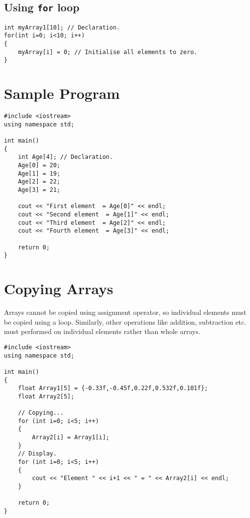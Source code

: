 \documentclass[12pt,a4paper]{article}
\begin{document}
\subsection{Using \texttt{for} loop}
\begin{lstlisting}[caption={Array initialisation using for loop}]
int myArray1[10]; // Declaration.
for(int i=0; i<10; i++)
{
	myArray[i] = 0; // Initialise all elements to zero.
}
\end{lstlisting}
\section{Sample Program}
\begin{lstlisting}[caption={Sample program}]
#include <iostream>
using namespace std;

int main()
{
	int Age[4]; // Declaration.
	Age[0] = 20;
	Age[1] = 19;
	Age[2] = 22;
	Age[3] = 21;

	cout << "First element  = Age[0]" << endl;
	cout << "Second element  = Age[1]" << endl;
	cout << "Third element  = Age[2]" << endl;
	cout << "Fourth element  = Age[3]" << endl;

	return 0;
}
\end{lstlisting}
\section{Copying Arrays}
Arrays cannot be copied using assignment operator, so individual elements must be copied using a loop. Similarly, other operations like addition, subtraction etc. must performed on individual elements rather than whole arrays.
\begin{lstlisting}[caption={Copying an array}]
#include <iostream>
using namespace std;

int main()
{
	float Array1[5] = {-0.33f,-0.45f,0.22f,0.532f,0.101f};
	float Array2[5];

	// Copying...
	for (int i=0; i<5; i++)
	{
		Array2[i] = Array1[i];
	}
	// Display.
	for (int i=0; i<5; i++)
	{
		cout << "Element " << i+1 << " = " << Array2[i] << endl;
	}

	return 0;
}
\end{lstlisting}
\end{document}
